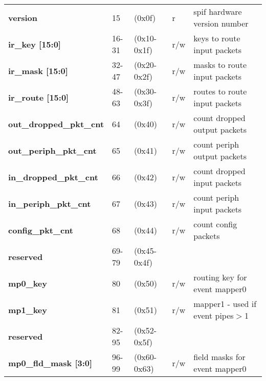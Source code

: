 \documentclass[11pt,a4paper,twoside]{article}
\begin{document}
\begin{center}
\begin{table}[!h]
\begin{tabularx}{\textwidth}{| p{37mm} p{13mm} p{21mm} p{6mm} X |}
		\textbf{version}                     & 15                         & (0x0f)                         & r                   & spif hardware version number \\%
		\textbf{ir\_key [15:0]}              & 16-31                      & (0x10-0x1f)                    & r/w                 & keys to route input packets \\%
		\textbf{ir\_mask [15:0]}             & 32-47                      & (0x20-0x2f)                    & r/w                 & masks to route input packets \\%
		\textbf{ir\_route [15:0]}            & 48-63                      & (0x30-0x3f)                    & r/w                 & routes to route input packets \\%
		\textbf{out\_dropped\_pkt\_cnt}      & 64                         & (0x40)                         & r/w                 & count dropped output packets\\%
		\textbf{out\_periph\_pkt\_cnt}       & 65                         & (0x41)                         & r/w                 & count periph output packets\\%
		\textbf{in\_dropped\_pkt\_cnt}       & 66                         & (0x42)                         & r/w                 & count dropped input packets \\%
		\textbf{in\_periph\_pkt\_cnt}        & 67                         & (0x43)                         & r/w                 & count periph input packets\\%
		\textbf{config\_pkt\_cnt}            & 68                         & (0x44)                         & r/w                 & count config packets \\%
		\cellcolor{gray!25}\textbf{reserved} & \cellcolor{gray!25}69-79   & \cellcolor{gray!25}(0x45-0x4f) & \cellcolor{gray!25} & \cellcolor{gray!25}\\%
		\textbf{mp0\_key}                    & 80                         & (0x50)                         & r/w                 & routing key for event mapper0 \\%
		\textbf{mp1\_key}                    & 81                         & (0x51)                         & r/w                 & mapper1 - used if event pipes$>$1 \\%
		\cellcolor{gray!25}\textbf{reserved} & \cellcolor{gray!25}82-95   & \cellcolor{gray!25}(0x52-0x5f) & \cellcolor{gray!25} & \cellcolor{gray!25}\\%
		\textbf{mp0\_fld\_mask [3:0]}        & 96-99                      & (0x60-0x63)                    & r/w                 & field masks for event mapper0 \\%

\end{tabularx}
\end{table}
\end{center}
\end{document}
